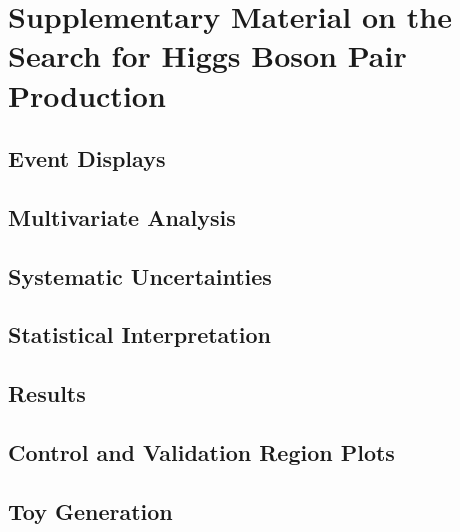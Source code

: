 \chapter{Supplementary Material on the Search for Higgs Boson Pair Production}

\section{Event Displays}%
\label{app:event_displays}

\clearpage

\section{Multivariate Analysis}%
\label{app:multivariate_analysis}

\clearpage

\section{Systematic Uncertainties}%
\label{app:uncertainties}

\clearpage

\section{Statistical Interpretation}%
\label{app:statistical_interpretation}

\clearpage

\section{Results}%
\label{app:results}

\clearpage

\section{Control and Validation Region Plots}%
\label{app:control_and_validation_regions}

\clearpage

\section{Toy Generation}%
\label{app:toy_generation}

\clearpage


% 

